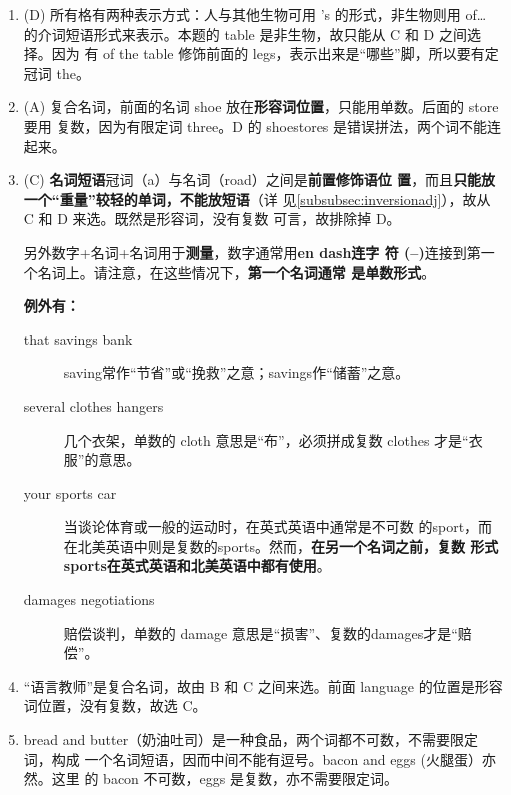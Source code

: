 \begin{enumerate}


\item (D) 所有格有两种表示方式：人与其他生物可用 's 的形式，非生物则用 of\ldots{}
  的介词短语形式来表示。本题的 table 是非生物，故只能从 C 和 D 之间选择。因为
  有 of the table 修饰前面的 legs，表示出来是“哪些”脚，所以要有定冠词 the。

\item (A) 复合名词，前面的名词 shoe 放在\textbf{形容词位置}，只能用单数。后面的 store 要用
  复数，因为有限定词 three。D 的 shoestores 是错误拼法，两个词不能连起来。

\item (C) \textbf{名词短语}冠词（a）与名词（road）之间是\textbf{前置修饰语位
    置}，而且\textbf{只能放一个“重量”较轻的单词，不能放短语}（详
  见\cref{subsubsec:inversionadj}），故从 C 和 D 来选。既然是形容词，没有复数
  可言，故排除掉 D。

  另外数字+名词+名词用于\textbf{测量}，数字通常用\textbf{en dash连字
    符 (--)}连接到第一个名词上。请注意，在这些情况下，\textbf{第一个名词通常
    是单数形式}。

  \textbf{例外有：}
  \begin{description}
  \item[that savings bank] saving常作“节省”或“挽救”之意；savings作“储蓄”之意。

  \item[several clothes hangers] 几个衣架，单数的 cloth 意思是“布”，必须拼成复数 clothes 才是“衣服”的意思。

  \item[your sports car] 当谈论体育或一般的运动时，在英式英语中通常是不可数
    的sport，而在北美英语中则是复数的sports。然而，\textbf{在另一个名词之前，复数
      形式sports在英式英语和北美英语中都有使用}。

  \item[damages negotiations]  赔偿谈判，单数的 damage 意思是“损害”、复数的damages才是“赔偿”。
  \end{description}

\item “语言教师”是复合名词，故由 B 和
  C 之间来选。前面 language 的位置是形容词位置，没有复数，故选 C。

\item bread and butter（奶油吐司）是一种食品，两个词都不可数，不需要限定词，构成
  一个名词短语，因而中间不能有逗号。bacon and eggs (火腿蛋）亦然。这里
  的 bacon 不可数，eggs 是复数，亦不需要限定词。


\end{enumerate}
